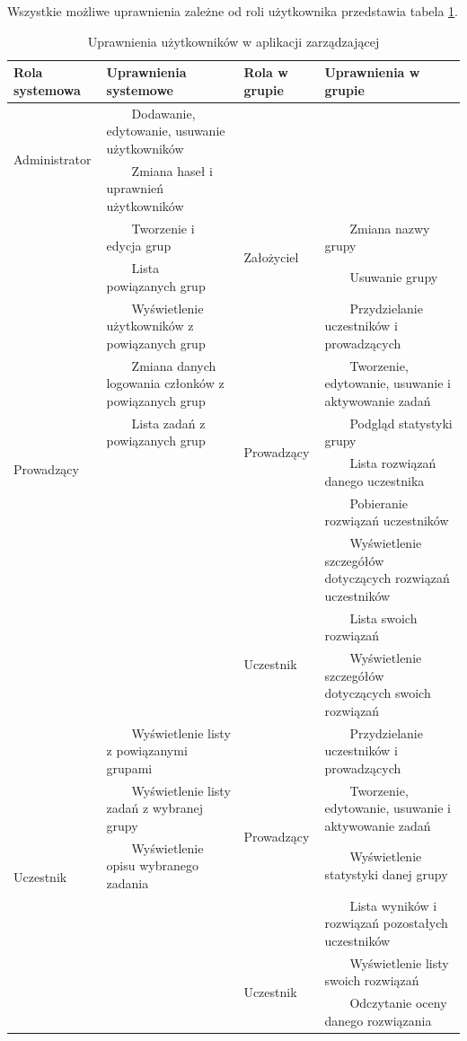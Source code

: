 \documentclass[brudnopis]{xmgr}
\newcommand{\tabitem}{~~\llap{\textbullet}~~}
\begin{document}
Wszystkie możliwe uprawnienia zależne od roli użytkownika przedstawia tabela \ref{uprawnienia:uzytkownikow}.
\newpage
\begin{table}[!tbh]\footnotesize
\begin{tabular}{|l|p{5cm}|l|p{5cm}|}
\hline
Rola systemowa & Uprawnienia systemowe & Rola w grupie & Uprawnienia w grupie \\ 
\hline
\multirow{2}{*}{Administrator} & \tabitem Dodawanie, edytowanie, usuwanie użytkowników & & \\
								& \tabitem Zmiana haseł i uprawnień użytkowników & & \\  								
\hline								 
\multirow{10}{*}{Prowadzący} & \tabitem Tworzenie i edycja grup & \multirow{2}{*}{Założyciel} & \tabitem Zmiana nazwy grupy \\
							& \tabitem Lista powiązanych grup & 									& \tabitem Usuwanie grupy \\ \cline{3-4}
							& \tabitem Wyświetlenie użytkowników z powiązanych grup & \multirow{6}{*}{Prowadzący} & \tabitem Przydzielanie uczestników i prowadzących \\
							& \tabitem Zmiana danych logowania członków z powiązanych grup & 				& \tabitem Tworzenie, edytowanie, usuwanie i aktywowanie zadań \\ 
							& \tabitem Lista zadań z powiązanych grup	&			& \tabitem Podgląd statystyki grupy \\
							& 							 & 							& \tabitem Lista rozwiązań danego uczestnika \\
							&  							 &							& \tabitem Pobieranie rozwiązań uczestników \\
							&  							 &							& \tabitem Wyświetlenie szczegółów dotyczących rozwiązań uczestników \\ \cline{3-4} 
						   	&							& \multirow{2}{*}{Uczestnik} & \tabitem Lista swoich rozwiązań \\
						   	&						 	&							& \tabitem Wyświetlenie szczegółów dotyczących swoich rozwiązań \\
\hline
\multirow{6}{*}{Uczestnik} & \tabitem Wyświetlenie listy z powiązanymi grupami & \multirow{4}{*}{Prowadzący} & \tabitem Przydzielanie uczestników i prowadzących \\
							& \tabitem Wyświetlenie listy zadań z wybranej grupy &			& \tabitem Tworzenie, edytowanie, usuwanie i aktywowanie zadań \\
							& \tabitem Wyświetlenie opisu wybranego zadania &			& \tabitem Wyświetlenie statystyki danej grupy \\
							&							&							& \tabitem Lista wyników i rozwiązań pozostałych uczestników \\ \cline{3-4}
							&							& \multirow{2}{*}{Uczestnik} & \tabitem Wyświetlenie listy swoich rozwiązań \\
							&							&							& \tabitem Odczytanie oceny danego rozwiązania \\
\hline	
\end{tabular}
\caption{Uprawnienia użytkowników w aplikacji zarządzającej\label{uprawnienia:uzytkownikow}}
\end{table}
\end{document}
